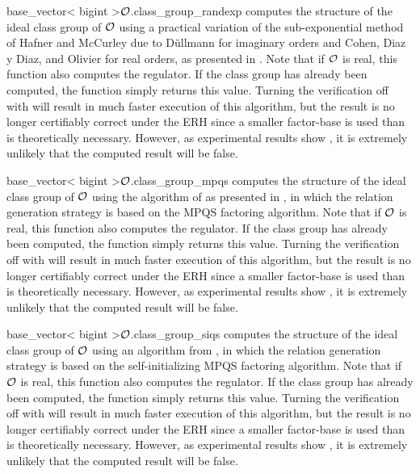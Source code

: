 \begin{fcode}{base_vector< bigint >}{$\mathcal{O}$.class_group_randexp}{}
  computes the structure of the ideal class group of $\mathcal{O}$ using a practical variation of the
  sub-exponential method of Hafner and McCurley \cite{Hafner/McCurley:1989} due to D\"ullmann
  \cite{Duellmann_Thesis:1991} for imaginary orders and Cohen, Diaz y Diaz, and Olivier
  \cite{Cohen/Diaz/Olivier:1993} for real orders, as presented in \cite{Jacobson_Thesis:1999}.
  Note that if $\mathcal{O}$ is real, this function also computes the regulator.  If the class group has
  already been computed, the function simply returns this value.  Turning the verification off
  with  will result in much faster execution of this
  algorithm, but the result is no longer certifiably correct under the ERH since a smaller
  factor-base is used than is theoretically necessary.  However, as experimental results show
  \cite{Jacobson:1998}, it is extremely unlikely that the computed result will be false.
\end{fcode}

\begin{fcode}{base_vector< bigint >}{$\mathcal{O}$.class_group_mpqs}{}
  computes the structure of the ideal class group of $\mathcal{O}$ using the algorithm of
  \cite{Jacobson:1999} as presented in \cite{Jacobson_Thesis:1999}, in which the relation
  generation strategy is based on the MPQS factoring algorithm.  Note that if $\mathcal{O}$ is real,
  this function also computes the regulator.  If the class group has already been computed, the
  function simply returns this value.  Turning the verification off with
   will result in much faster execution of this
  algorithm, but the result is no longer certifiably correct under the ERH since a smaller
  factor-base is used than is theoretically necessary.  However, as experimental results show
  \cite{Jacobson:1998}, it is extremely unlikely that the computed result will be false.
\end{fcode}

\begin{fcode}{base_vector< bigint >}{$\mathcal{O}$.class_group_siqs}{}
  computes the structure of the ideal class group of $\mathcal{O}$ using an algorithm from
  \cite{Jacobson_Thesis:1999}, in which the relation generation strategy is based on the
  self-initializing MPQS factoring algorithm.  Note that if $\mathcal{O}$ is real, this function also
  computes the regulator.  If the class group has already been computed, the function simply
  returns this value.  Turning the verification off with
   will result in much faster execution of this
  algorithm, but the result is no longer certifiably correct under the ERH since a smaller
  factor-base is used than is theoretically necessary.  However, as experimental results show
  \cite{Jacobson:1998}, it is extremely unlikely that the computed result will be false.
\end{fcode}

